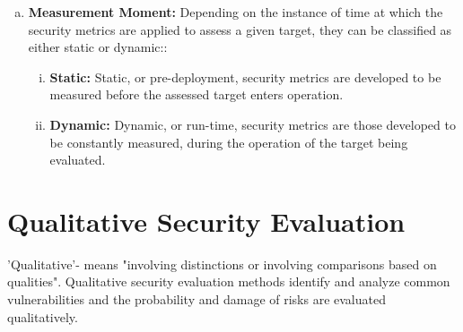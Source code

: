 \documentclass[pdftex,english,oribibl]{llncs}
\begin{document}
\begin{enumerate}[(a)]
	\item {\textbf{Measurement Moment:} Depending on the instance of time at which the security metrics are applied to assess a given target, they can be classified as either static or dynamic::}
	\begin{enumerate}[(i)]
	\item {\textbf{Static:} Static, or pre-deployment, security metrics are developed to be measured before the assessed target enters operation.}
	\item {\textbf{Dynamic:} Dynamic, or run-time, security metrics are those developed to be constantly measured, during the operation of the target being evaluated.}
	\end{enumerate}

\end{enumerate}
	
\section{Qualitative Security Evaluation}\label{sec:qualitative}
'Qualitative'- means "involving distinctions or involving comparisons based on qualities". Qualitative security evaluation methods identify and analyze common vulnerabilities and the probability and damage of risks are evaluated qualitatively.
\end{document}
